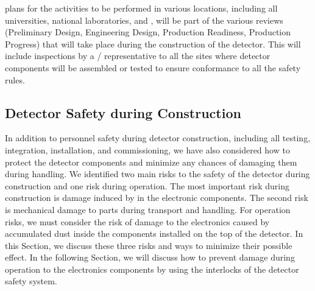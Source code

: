  plans for the activities to be performed in various
locations, including all universities, national laboratories,
and , will be part of the 
various reviews (Preliminary Design, Engineering Design, Production 
Readiness, Production Progress) that will take place during the construction of the detector.
This will include inspections by a / 
representative to all the sites where detector components will be 
assembled or tested to ensure conformance to all the safety
rules.

\subsection{Detector Safety during Construction}
\label{sec:fdsp-tpcelec-safety-detcon}


In addition to personnel safety during detector
construction, including all testing, 
integration, installation, and commissioning, we have also
considered how to protect the detector
components and minimize any chances of damaging
them during handling. We identified two main risks 
to the safety of the detector during construction and one risk during
operation. The most important risk during construction is damage 
induced by  in the 
electronic components. The second risk is mechanical damage to 
parts during transport and handling. For operation risks, we
must consider the risk of damage to the electronics 
caused by accumulated dust inside the components
installed on the top of the detector. In this Section, 
we discuss these three risks and ways to minimize their possible 
effect. In the following Section, we will discuss how to prevent
damage during operation to the  electronics components 
by using the interlocks of the detector safety system.

